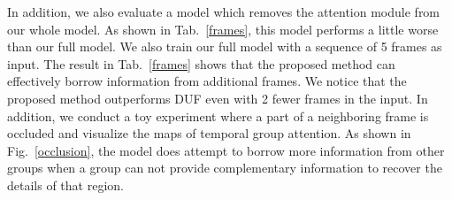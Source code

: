 In addition, we also evaluate a model which removes the attention module from our whole model. 
As shown in Tab.~\ref{frames}, this model performs a little worse than our full model. 
We also train our full model with a sequence of 5 frames as input. The result in Tab.~\ref{frames} shows that the proposed method can effectively borrow information from additional frames. We notice that the proposed method outperforms DUF even with 2 fewer frames in the input.
In addition, we conduct a toy experiment where a part of a neighboring frame is occluded and visualize the maps of temporal group attention. As shown in Fig.~\ref{occlusion}, the model does attempt to borrow more information from other groups when a group can not provide complementary information to recover the details of that region. 
\begin{table}[th]
	\begin{center}
	\end{center}
\vspace{1mm}
	\caption{Ablations on: group attention (GA) module and the influence of the different input frames in our hierarchical information aggregation way.}
    \vspace{-5mm}
	\label{frames}
\end{table}

